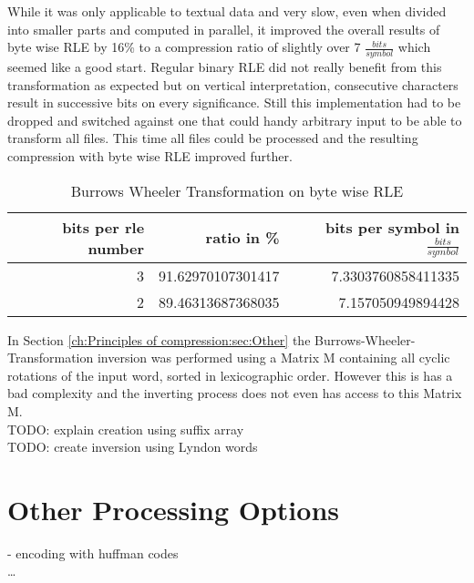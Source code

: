 \par{
While it was only applicable to textual data and very slow, even when divided into smaller parts and computed in parallel, it improved the overall results of byte wise RLE by 16\% to a compression ratio of slightly over 7 $\frac{bits}{symbol}$ which seemed like a good start. Regular binary RLE did not really benefit from this transformation as expected but on vertical interpretation, consecutive characters result in successive bits on every significance. Still this implementation had to be dropped and switched against one that could handy arbitrary input to be able to transform all files. This time all files could be processed and the resulting compression with byte wise RLE improved further.

\begin{table}[H]
	\centering
	\begin{tabular}{r|r|r}	
		bits per rle number & ratio in \% & bits per symbol in $\frac{bits}{symbol}$\\
		\hline
		3 & 91.62970107301417 & 7.3303760858411335\\
		2 & 89.46313687368035 & 7.157050949894428
	\end{tabular}
	\caption{Burrows Wheeler Transformation on byte wise RLE}
	\label{tab:t12 Burrows Wheeler Transformation on byte wise RLE}
\end{table}
}

\par{
In Section \ref{ch:Principles of compression:sec:Other} the Burrows-Wheeler-Transformation inversion was performed using a Matrix M containing all cyclic rotations of the input word, sorted in lexicographic order. However this is has a bad complexity and the inverting process does not even has access to this Matrix M.\\

TODO: explain creation using suffix array \\

TODO: create inversion using Lyndon words\\
}

\par{

}

\section{Other Processing Options}
\label{ch:Conceptual Design:sec:Postprocessing}
- encoding with huffman codes\\
\ldots

